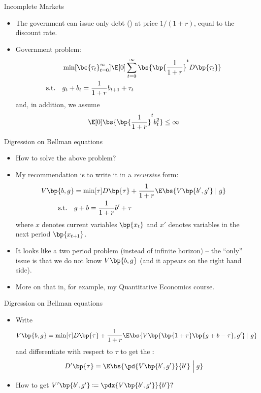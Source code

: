 \documentclass[11pt,xcolor={dvipsnames},hyperref={pdftex,pdfpagemode=UseNone,hidelinks,pdfdisplaydoctitle=true},usepdftitle=false]{beamer}
\begin{document}
    
    \begin{frame}{Incomplete Markets}
    \begin{itemize}
    \item The government can issue only  debt () at price $1/\left(1+r\right)$,
    equal to the discount rate. 
    \item Government problem:
    \begin{align*}
     &  \min[\bc{\tau_t}_{t=0}^\infty] \E[0] \sum_{t=0}^\infty \bs{\bp{\frac{1}{1+r}}^t D\bp{\tau_t}}\\
    \text{s.t.}\quad & g_{t}+b_{t}=\frac{1}{1+r}b_{t+1}+\tau_{t}
    \end{align*}
    and, in addition, we assume 
    \[
        \E[0] \bs{\bp{\frac{1}{1+r}}^t b^2_t} \le \infty
    \]
    \end{itemize}
    \end{frame}
    \begin{frame}{Digression on Bellman equations}
    \begin{itemize}
    \item How to solve the above problem? 
    \item My recommendation is to write it in a \emph{recursive} form: 
    \begin{align*}
    V\bp{b,g} & =\min[\tau] D\bp{\tau}+\frac{1}{1+r}\E\bs{V\bp{b',g'} \mid g }\\
    \text{s.t.}\quad & g+b=\frac{1}{1+r}b'+\tau
    \end{align*}
    where $x$ denotes current variables $\bp{x_{t}}$ and $x'$ denotes
    variables in the next period $\bp{x_{t+1}}$. 
    \item It looks like a two period problem (instead of infinite horizon)
    -- the ``only'' issue is that we do not know $V\bp{b,g}$
    (and it appears on the right hand side). 
    \item More on that in, for example, my Quantitative Economics course. 
    \end{itemize}
    \end{frame}
    \begin{frame}{Digression on Bellman equations}
    \begin{itemize}
    \item Write
    \begin{align*}
        V\bp{b,g} & =\min[\tau] D\bp{\tau}+\frac{1}{1+r}\E\bs{V\bp{\bp{1+r}\bp{g+b-\tau},g'} \mid g }
    \end{align*}
    and differentiate with respect to $\tau$ to get the :
    \[
    D'\bp{\tau}=\E\bs{\pd{V\bp{b',g'}}{b'} \mathrel{\Big|} g}   \]
    \item How to get $V'\bp{b',g'}\coloneqq \pdx{V\bp{b',g'}}{b'}?$
    \end{itemize}
    \end{frame}
\end{document}
